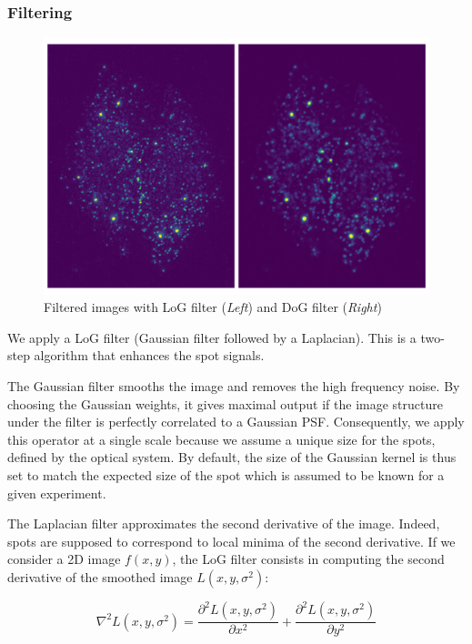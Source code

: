 \subsubsection{Filtering}

\begin{figure}[]
    \centering
    \includegraphics[width=1\textwidth]{figures/chapter2/filter_background}
    \caption[Filtered images with LoG and DoG filters]{Filtered images with LoG filter (\textit{Left}) and DoG filter (\textit{Right})}
    \label{fig:filters_detection}
\end{figure}

We apply a \ac{LoG} filter (Gaussian filter followed by a Laplacian).
This is a two-step algorithm that enhances the spot signals.

The Gaussian filter smooths the image and removes the high frequency noise.
By choosing the Gaussian weights, it gives maximal output if the image structure under the filter is perfectly correlated to a Gaussian \ac{PSF}.
Consequently, we apply this operator at a single scale because we assume a unique size for the spots, defined by the optical system.
By default, the size of the Gaussian kernel is thus set to match the expected size of the spot which is assumed to be known for a given experiment.

The Laplacian filter approximates the second derivative of the image.
Indeed, spots are supposed to correspond to local minima of the second derivative.
If we consider a 2D image $f(x,y)$, the \ac{LoG} filter consists in computing the second derivative of the smoothed image $L(x, y, \sigma^2)$:

\begin{equation}
	{\displaystyle \nabla^{2}L(x, y, \sigma^2) = \frac{\partial^{2}L(x, y, \sigma^2)}{\partial x^2} + \frac{\partial^{2}L(x, y, \sigma^2)}{\partial y^2}}
\end{equation}

